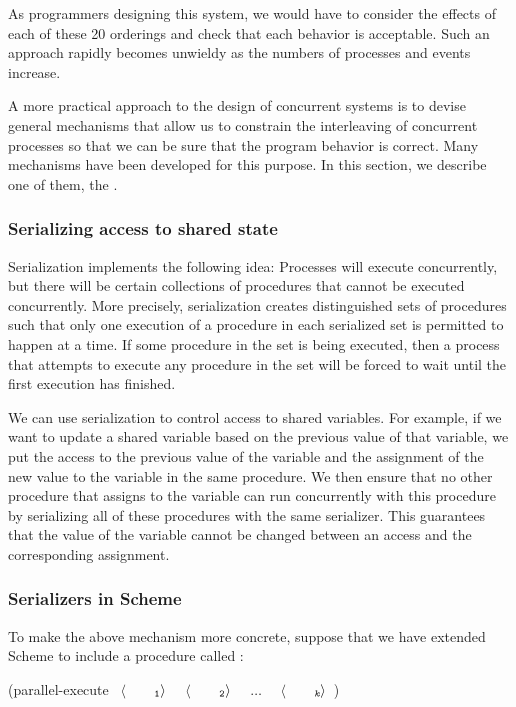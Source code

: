 \noindent
As programmers designing this system, we would have to consider the effects of
each of these 20 orderings and check that each behavior is acceptable.  Such an
approach rapidly becomes unwieldy as the numbers of processes and events
increase.

A more practical approach to the design of concurrent systems is to devise
general mechanisms that allow us to constrain the interleaving of concurrent
processes so that we can be sure that the program behavior is correct.  Many
mechanisms have been developed for this purpose.  In this section, we describe
one of them, the .

\subsubsection*{Serializing access to shared state}

Serialization implements the following idea: Processes will execute
concurrently, but there will be certain collections of procedures that cannot
be executed concurrently.  More precisely, serialization creates distinguished
sets of procedures such that only one execution of a procedure in each
serialized set is permitted to happen at a time.  If some procedure in the set
is being executed, then a process that attempts to execute any procedure in the
set will be forced to wait until the first execution has finished.

We can use serialization to control access to shared variables.  For example,
if we want to update a shared variable based on the previous value of that
variable, we put the access to the previous value of the variable and the
assignment of the new value to the variable in the same procedure.  We then
ensure that no other procedure that assigns to the variable can run
concurrently with this procedure by serializing all of these procedures with
the same serializer.  This guarantees that the value of the variable cannot be
changed between an access and the corresponding assignment.

\subsubsection*{Serializers in Scheme}

To make the above mechanism more concrete, suppose that we have extended Scheme
to include a procedure called :

\begin{codeBlock}
(parallel-execute ~\(\langle \)~~~~\(_{\mono{1}}\rangle \)~ ~\(\langle \)~~~~\(_{\mono{2}}\rangle \)~ ~\( \dots \)~ ~\(\langle \)~~~~\(_{\monoItalic{k}}\rangle \)~)
\end{codeBlock}

